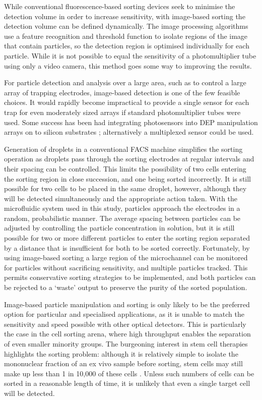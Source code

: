 While conventional fluorescence-based sorting devices seek to minimise the detection volume in order to increase sensitivity, with image-based sorting the detection volume can be defined dynamically. The image processing algorithms use a feature recognition and threshold function to isolate regions of the image that contain particles, so the detection region is optimised individually for each particle. While it is not possible to equal the sensitivity of a photomultiplier tube using only a video camera, this method goes some way to improving the results.

For particle detection and analysis over a large area, such as to control a large array of trapping electrodes, image-based detection is one of the few feasible choices. It would rapidly become impractical to provide a single sensor for each trap for even moderately sized arrays if standard photomultiplier tubes were used. Some success has been had integrating photosensors into DEP manipulation arrays on to silicon substrates \citep{Manaresi:2003}; alternatively a multiplexed sensor could be used.

Generation of droplets in a conventional FACS machine simplifies the sorting operation as droplets pass through the sorting electrodes at regular intervals and their spacing can be controlled. This limits the possibility of two cells entering the sorting region in close succession, and one being sorted incorrectly. It is still possible for two cells to be placed in the same droplet, however, although they will be detected simultaneously and the appropriate action taken. With the microfluidic system used in this study, particles approach the electrodes in a random, probabilistic manner. The average spacing between particles can be adjusted by controlling the particle concentration in solution, but it is still possible for two or more different particles to enter the sorting region separated by a distance that is insufficient for both to be sorted correctly. Fortunately, by using image-based sorting a large region of the microchannel can be monitored for particles without sacrificing sensitivity, and multiple particles tracked. This permits conservative sorting strategies to be implemented, and both particles can be rejected to a `waste' output to preserve the purity of the sorted population.

Image-based particle manipulation and sorting is only likely to be the preferred option for particular and specialised applications, as it is unable to match the sensitivity and speed possible with other optical detectors. This is particularly the case in the cell sorting arena, where high throughput enables the separation of even smaller minority groups. The burgeoning interest in stem cell therapies highlights the sorting problem: although it is relatively simple to isolate the mononuclear fraction of an ex vivo sample before sorting, stem cells may still make up less than 1 in 10,000 of these cells \citep{Pittenger:1999}. Unless such numbers of cells can be sorted in a reasonable length of time, it is unlikely that even a single target cell will be detected.

